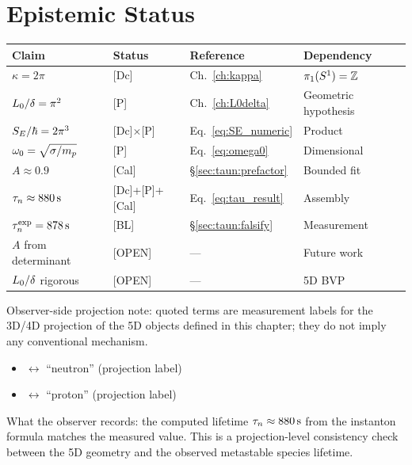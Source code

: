 \section{Epistemic Status}
\label{sec:taun:epistemic}

\begin{center}
\begin{tabular}{llll}
\toprule
\textbf{Claim} & \textbf{Status} & \textbf{Reference} & \textbf{Dependency} \\
\midrule
$\kappa = 2\pi$ & [Dc] & Ch.~\ref{ch:kappa} & $\pi_1(S^1) = \mathbb{Z}$ \\
$L_0/\delta = \pi^2$ & [P] & Ch.~\ref{ch:L0delta} & Geometric hypothesis \\
$S_E/\hbar = 2\pi^3$ & [Dc]$\times$[P] & Eq.~\eqref{eq:SE_numeric} & Product \\
$\omega_0 = \sqrt{\sigma/m_p}$ & [P] & Eq.~\eqref{eq:omega0} & Dimensional \\
$A \approx 0.9$ & [Cal] & \S\ref{sec:taun:prefactor} & Bounded fit \\
$\tau_n \approx 880\,\mathrm{s}$ & [Dc]+[P]+[Cal] & Eq.~\eqref{eq:tau_result} & Assembly \\
\midrule
$\tau_n^{\text{exp}} = 878\,\mathrm{s}$ & [BL] & \S\ref{sec:taun:falsify} & Measurement \\
\midrule
$A$ from determinant & [OPEN] & — & Future work \\
$L_0/\delta$ rigorous & [OPEN] & — & 5D BVP \\
\bottomrule
\end{tabular}
\end{center}


\begin{observerbox}
Observer-side projection note: quoted terms are measurement labels for the
3D/4D projection of the 5D objects defined in this chapter; they do not
imply any conventional mechanism.

\begin{itemize}
    \item \MetastableJunction{} $\leftrightarrow$ ``neutron'' (projection label)
    \item \AnchorJunction{} $\leftrightarrow$ ``proton'' (projection label)
\end{itemize}

What the observer records: the computed lifetime $\tau_n \approx 880\,\mathrm{s}$
from the instanton formula matches the measured value. This is a
projection-level consistency check between the 5D geometry and the
observed metastable species lifetime.
\end{observerbox}


